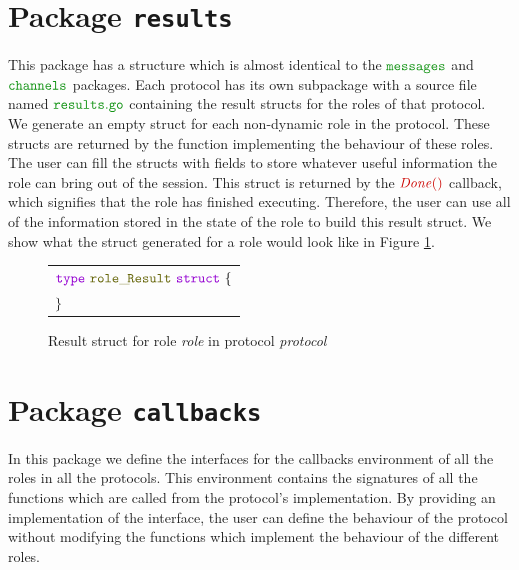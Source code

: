 \documentclass[12pt,twoside]{report}
\begin{document}

\section{Package \texttt{results}}
This package has a structure which is almost identical to the $\pkgname{messages}$ and $\pkgname{channels}$ packages. Each protocol has its own subpackage with a source file named $\filename{results}$ containing the result structs for the roles of that protocol.\\

We generate an empty struct for each non-dynamic role in the protocol. These structs are returned by the function implementing the behaviour of these roles. The user can fill the structs with fields to store whatever useful information the role can bring out of the session. This struct is returned by the $\functionname{Done()}$ callback, which signifies that the role has finished executing. Therefore, the user can use all of the information stored in the state of the role to build this result struct. We show what the struct generated for a role would look like in Figure \ref{result-struct-gen}.

\begin{figure}[!h]
    \begin{center}
        \begin{tabular}{l}
            $\gotype\ \structname{role\_\!Result}\ \gostruct\ \{$\\[3pt]
            $\}$
        \end{tabular}
    \end{center}
    \caption{Result struct for role \textit{role} in protocol \textit{protocol}}
    \label{result-struct-gen}
\end{figure}

\section{Package \texttt{callbacks}}\label{pkg-callbacks}
In this package we define the interfaces for the callbacks environment of all the roles in all the protocols. This environment contains the signatures of all the functions which are called from the protocol's implementation. By providing an implementation of the interface, the user can define the behaviour of the protocol without modifying the functions which implement the behaviour of the different roles.\\
\end{document}
